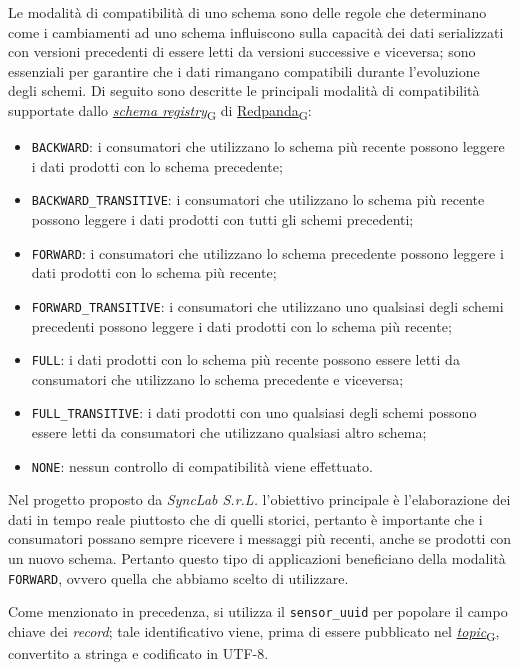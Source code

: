Le modalità di compatibilità di uno schema sono delle regole che determinano come i cambiamenti ad uno schema influiscono sulla capacità dei dati serializzati con
versioni precedenti di essere letti da versioni successive e viceversa; sono essenziali per garantire che i dati rimangano compatibili durante l'evoluzione degli schemi.
Di seguito sono descritte le principali modalità di compatibilità supportate dallo \href{https://7last.github.io/docs/pb/documentazione-interna/glossario\#schema-registry}{\textit{schema registry}\textsubscript{G}} di \href{https://7last.github.io/docs/pb/documentazione-interna/glossario\#redpanda}{Redpanda\textsubscript{G}}:

\begin{itemize}
	\item \texttt{BACKWARD}: i consumatori che utilizzano lo schema più recente possono leggere i dati prodotti con lo schema precedente;
	\item \texttt{BACKWARD\_TRANSITIVE}: i consumatori che utilizzano lo schema più recente possono leggere i dati prodotti con tutti gli schemi precedenti;
	\item \texttt{FORWARD}: i consumatori che utilizzano lo schema precedente possono leggere i dati prodotti con lo schema più recente;
	\item \texttt{FORWARD\_TRANSITIVE}: i consumatori che utilizzano uno qualsiasi degli schemi precedenti possono leggere i dati prodotti con lo schema più recente;
	\item \texttt{FULL}: i dati prodotti con lo schema più recente possono essere letti da consumatori che utilizzano lo schema precedente e viceversa;
	\item \texttt{FULL\_TRANSITIVE}: i dati prodotti con uno qualsiasi degli schemi possono essere letti da consumatori che utilizzano qualsiasi altro schema;
	\item \texttt{NONE}: nessun controllo di compatibilità viene effettuato.
\end{itemize}
Nel progetto proposto da \textit{SyncLab S.r.L.} l'obiettivo principale è l'elaborazione dei dati in tempo reale piuttosto che di quelli storici, pertanto
è importante che i consumatori possano sempre ricevere i messaggi più recenti, anche se prodotti con un nuovo schema. Pertanto questo tipo di applicazioni beneficiano
della modalità \texttt{FORWARD}, ovvero quella che abbiamo scelto di utilizzare.

Come menzionato in precedenza, si utilizza il \texttt{sensor\_uuid} per popolare il campo chiave dei \textit{record}; tale identificativo viene, prima di essere pubblicato
nel \href{https://7last.github.io/docs/pb/documentazione-interna/glossario\#topic}{\textit{topic}\textsubscript{G}}, convertito a stringa e codificato in UTF-8.

